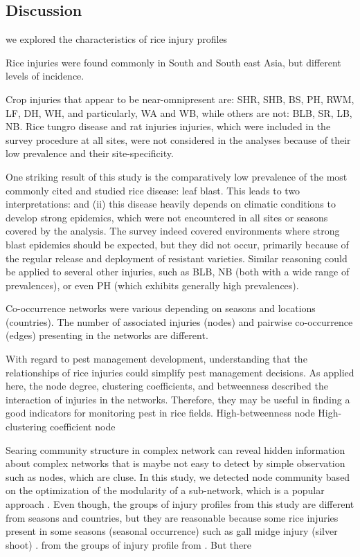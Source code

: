 \subsection{Discussion}

we explored the characteristics of rice injury profiles

Rice injuries were found commonly in South and South east Asia, but different levels of incidence.

Crop injuries that appear to be near-omnipresent are: SHR, SHB, BS, PH, RWM, LF, DH, WH, and particularly, WA and WB, while others are not: BLB, SR, LB, NB. Rice tungro disease and rat injuries injuries, which were included in the survey procedure at all sites, were not considered in the analyses because of their low prevalence and their site-specificity. 

One striking result of this study is the comparatively low prevalence of the most commonly cited and studied rice disease: leaf blast. This leads to two interpretations: and (ii) this disease heavily depends on climatic conditions to develop strong epidemics, which were not encountered in all sites or seasons covered by the analysis. The survey indeed covered environments where strong blast epidemics should be expected, but they did not occur, primarily because of the regular release and deployment of resistant varieties. Similar reasoning could be applied to several other injuries, such as BLB, NB (both with a wide range of prevalences), or even PH (which exhibits generally high prevalences).

Co-occurrence networks were various depending on seasons and locations (countries). The number of associated injuries (nodes) and pairwise co-occurrence (edges) presenting in the networks are different.

With regard to pest management development, understanding that the relationships of rice injuries could simplify pest management decisions. As applied here, the node degree, clustering coefficients, and betweenness described the interaction of injuries in the networks. Therefore, they may be useful in finding a good indicators for monitoring pest in rice fields. High-betweenness node High- clustering coefficient node 



Searing community structure in complex network can reveal hidden information about complex networks that is maybe not easy to detect by simple observation such as nodes, which are cluse. In this study, we detected node community based on the optimization of the modularity of a sub-network, which is a popular approach \cite{Liu_2014_Detecting}. Even though, the groups of injury profiles from this study are different from seasons and countries, but they are reasonable because some rice injuries present in some seasons (seasonal occurrence) such as gall midge injury (silver shoot) \cite{Krishnaiah_2004_Rice}. from the groups of injury profile from \cite{Savary_2000_Characterization}. But there 


